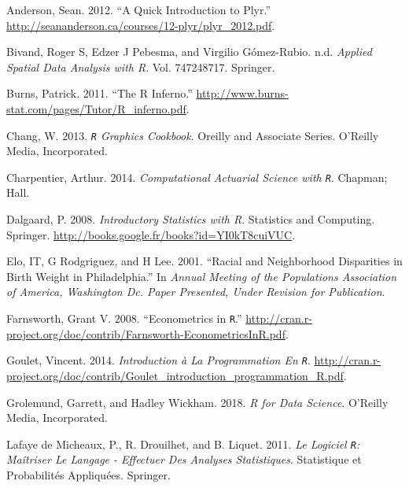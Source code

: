\documentclass[
  11pt,
]{book}
\numberwithin{equation}{section}
\numberwithin{countremarque}{section}
\newlength{\cslhangindent}
\newenvironment{cslreferences}%
  {\setlength{\parindent}{0pt}%
  \everypar{\setlength{\hangindent}{\cslhangindent}}\ignorespaces}%
  {\par}
\begin{document}
\hypertarget{refs}{}
\begin{cslreferences}
\leavevmode\hypertarget{ref-Anderson_2012_A_Quick}{}%
Anderson, Sean. 2012. ``A Quick Introduction to Plyr.'' \url{http://seananderson.ca/courses/12-plyr/plyr_2012.pdf}.

\leavevmode\hypertarget{ref-Bivand_2008_Applied}{}%
Bivand, Roger S, Edzer J Pebesma, and Virgilio Gómez-Rubio. n.d. \emph{Applied Spatial Data Analysis with R}. Vol. 747248717. Springer.

\leavevmode\hypertarget{ref-Burns_2011_R}{}%
Burns, Patrick. 2011. ``The R Inferno.'' \url{http://www.burns-stat.com/pages/Tutor/R_inferno.pdf}.

\leavevmode\hypertarget{ref-Chang_2013_R}{}%
Chang, W. 2013. \emph{\texttt{R} Graphics Cookbook}. Oreilly and Associate Series. O'Reilly Media, Incorporated.

\leavevmode\hypertarget{ref-Charpentier_2014_Computational}{}%
Charpentier, Arthur. 2014. \emph{Computational Actuarial Science with \texttt{R}}. Chapman; Hall.

\leavevmode\hypertarget{ref-Dalgaard_2008_Introductory}{}%
Dalgaard, P. 2008. \emph{Introductory Statistics with R}. Statistics and Computing. Springer. \url{http://books.google.fr/books?id=YI0kT8cuiVUC}.

\leavevmode\hypertarget{ref-Elo_2001_Racial}{}%
Elo, IT, G Rodgriguez, and H Lee. 2001. ``Racial and Neighborhood Disparities in Birth Weight in Philadelphia.'' In \emph{Annual Meeting of the Populations Association of America, Washington Dc. Paper Presented, Under Revision for Publication}.

\leavevmode\hypertarget{ref-Farnsworth_2008_Econometrics}{}%
Farnsworth, Grant V. 2008. ``Econometrics in \texttt{R}.'' \url{http://cran.r-project.org/doc/contrib/Farnsworth-EconometricsInR.pdf}.

\leavevmode\hypertarget{ref-Goulet_2014_Introduction}{}%
Goulet, Vincent. 2014. \emph{Introduction à La Programmation En \texttt{R}}. \url{http://cran.r-project.org/doc/contrib/Goulet_introduction_programmation_R.pdf}.

\leavevmode\hypertarget{ref-grolemund_2018_r}{}%
Grolemund, Garrett, and Hadley Wickham. 2018. \emph{R for Data Science}. O'Reilly Media, Incorporated.

\leavevmode\hypertarget{ref-Lafaye_2011_Logiciel}{}%
Lafaye de Micheaux, P., R. Drouilhet, and B. Liquet. 2011. \emph{Le Logiciel \texttt{R}: Maîtriser Le Langage - Effectuer Des Analyses Statistiques}. Statistique et Probabilités Appliquées. Springer.


\end{cslreferences}
\end{document}
